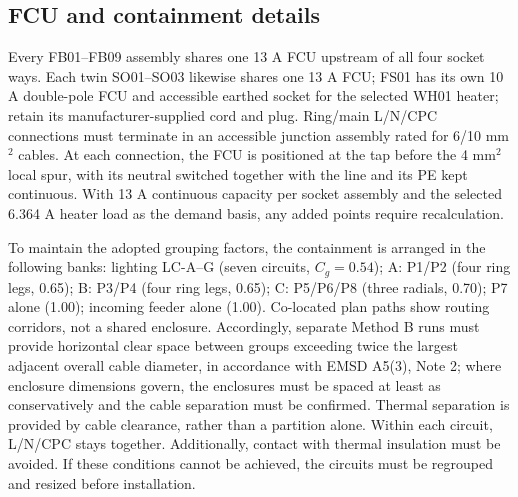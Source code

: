 \subsection*{FCU and containment details}
Every FB01--FB09 assembly shares one 13 A FCU upstream of all four socket ways. Each twin SO01--SO03 likewise shares one 13 A FCU; FS01 has its own 10 A double-pole FCU and accessible earthed socket for the selected WH01 heater; retain its manufacturer-supplied cord and plug. Ring/main L/N/CPC connections must terminate in an accessible junction assembly rated for 6/10 mm$^2$ cables. At each connection, the FCU is positioned at the tap before the 4 mm$^2$ local spur, with its neutral switched together with the line and its PE kept continuous. With 13 A continuous capacity per socket assembly and the selected 6.364 A heater load as the demand basis, any added points require recalculation.

To maintain the adopted grouping factors, the containment is arranged in the following banks: lighting LC-A--G (seven circuits, $C_g=0.54$); A: P1/P2 (four ring legs, 0.65); B: P3/P4 (four ring legs, 0.65); C: P5/P6/P8 (three radials, 0.70); P7 alone (1.00); incoming feeder alone (1.00). Co-located plan paths show routing corridors, not a shared enclosure. Accordingly, separate Method B runs must provide horizontal clear space between groups exceeding twice the largest adjacent overall cable diameter, in accordance with EMSD A5(3), Note 2; where enclosure dimensions govern, the enclosures must be spaced at least as conservatively and the cable separation must be confirmed. Thermal separation is provided by cable clearance, rather than a partition alone. Within each circuit, L/N/CPC stays together. Additionally, contact with thermal insulation must be avoided. If these conditions cannot be achieved, the circuits must be regrouped and resized before installation.
